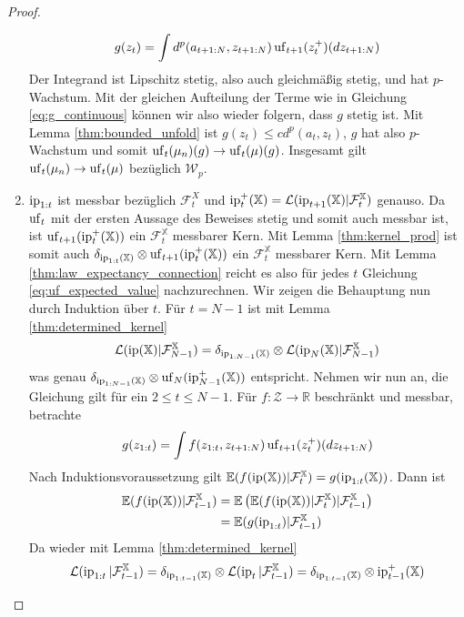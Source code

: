 \begin{proof}
\begin{enumerate}
    $$g(z_t) = \int d^p(a_{t+1:N}, z_{t+1:N})\operatorname{uf}_{t+1}(z_t^+)(dz_{t+1:N})$$
    Der Integrand ist Lipschitz stetig, also auch gleichmäßig stetig, und hat $p$-Wachstum. Mit der gleichen Aufteilung der Terme wie in Gleichung \ref{eq:g_continuous} können wir also wieder folgern, dass $g$ stetig ist. Mit Lemma \ref{thm:bounded_unfold} ist $g(z_t)\leq cd^p(a_t, z_t)$, $g$ hat also $p$-Wachstum und somit $\operatorname{uf}_{t}(\mu_n)(g)\rightarrow \operatorname{uf}_{t}(\mu)(g)$. Insgesamt gilt $\operatorname{uf}_{t}(\mu_n)\rightarrow\operatorname{uf}_t(\mu)$ bezüglich $\mathcal{W}_p$.
    \item $\operatorname{ip}_{1:t}$ ist messbar bezüglich $\mathcal{F}_t^X$ und $\operatorname{ip}_t^+(\mathbb{X})=\mathcal{L}(\operatorname{ip}_{t+1}(\mathbb{X})\vert \mathcal{F}_t^\mathbb{X})$ genauso. Da $\operatorname{uf}_t$ mit der ersten Aussage des Beweises stetig und somit auch messbar ist, ist $\operatorname{uf}_{t+1}(\operatorname{ip}_t^+(\mathbb{X}))$ ein $\mathcal{F}_t^\mathbb{X}$ messbarer Kern. Mit Lemma \ref{thm:kernel_prod} ist somit auch $\delta_{\operatorname{ip}_{1:t}(\mathbb{X})}\otimes \operatorname{uf}_{t+1}(\operatorname{ip}_t^+(\mathbb{X}))$ ein $\mathcal{F}_t^\mathbb{X}$ messbarer Kern. Mit Lemma \ref{thm:law_expectancy_connection} reicht es also für jedes $t$ Gleichung \ref{eq:uf_expected_value} nachzurechnen. Wir zeigen die Behauptung nun durch Induktion über $t$. Für $t=N-1$ ist mit Lemma \ref{thm:determined_kernel} 
    $$\mathcal{L}(\operatorname{ip}(\mathbb{X})\vert \mathcal{F}_{N-1}^\mathbb{X})=\delta_{\operatorname{ip}_{1:N-1}(\mathbb{X})} \otimes \mathcal{L}(\operatorname{ip}_N(\mathbb{X})\vert \mathcal{F}_{N-1}^\mathbb{X})$$
    was genau $\delta_{\operatorname{ip}_{1:N-1}(\mathbb{X})}\otimes \operatorname{uf}_{N}(\operatorname{ip}_{N-1}^+(\mathbb{X}))$ entspricht. Nehmen wir nun an, die Gleichung gilt für ein $2\leq t\leq N-1$. Für $f: \mathcal{Z}\rightarrow\mathbb{R}$ beschränkt und messbar, betrachte
    $$g(z_{1:t})=\int f(z_{1:t}, z_{t+1:N})\operatorname{uf}_{t+1}(z_t^+)(dz_{t+1:N})$$
    Nach Induktionsvoraussetzung gilt $\mathbb{E}(f(\operatorname{ip}(\mathbb{X}))\vert\mathcal{F}_t^\mathbb{X})=g(\operatorname{ip}_{1:t}(\mathbb{X}))$.
    Dann ist 
    \begin{align*}
    \mathbb{E}(f(\operatorname{ip}(\mathbb{X}))\vert\mathcal{F}_{t-1}^\mathbb{X}) &= \mathbb{E}\left( \mathbb{E}(f(\operatorname{ip}(\mathbb{X}))\vert \mathcal{F}_{t}^\mathbb{X}) \vert \mathcal{F}_{t-1}^\mathbb{X}\right) \\
    &= \mathbb{E}(g(\operatorname{ip}_{1:t})\vert \mathcal{F}_{t-1}^\mathbb{X})
    \end{align*}
    Da wieder mit Lemma \ref{thm:determined_kernel} 
    $$\mathcal{L}(\operatorname{ip}_{1:t}\vert \mathcal{F}_{t-1}^\mathbb{X})=\delta_{\operatorname{ip}_{1:t-1}(\mathbb{X})}\otimes \mathcal{L}(\operatorname{ip}_t\vert \mathcal{F}_{t-1}^\mathbb{X})=\delta_{\operatorname{ip}_{1:t-1}(\mathbb{X})}\otimes \operatorname{ip}_{t-1}^+(\mathbb{X})$$

\end{enumerate}
\end{proof}
